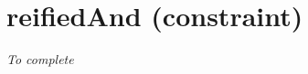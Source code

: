 \section{reifiedAnd (constraint)}\label{reifiedand:reifiedandconstraint}\hypertarget{reifiedand:reifiedandconstraint}{}
\emph{To complete}
